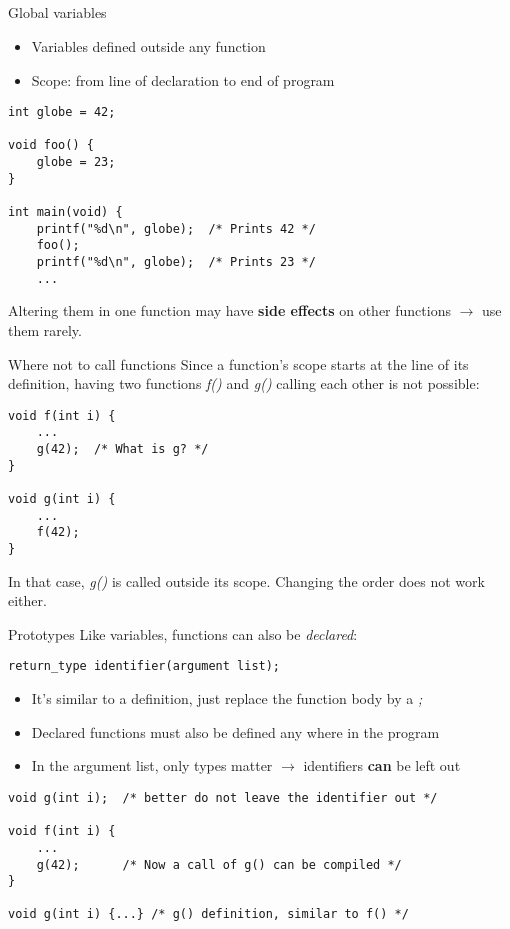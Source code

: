 \subsection{}
\begin{frame}[fragile]{Global variables}
	\begin{itemize}
		\item Variables defined outside any function
		\item Scope: from line of declaration to end of program
	\end{itemize}
	\begin{lstlisting}
int globe = 42;

void foo() {
	globe = 23;
}

int main(void) {
	printf("%d\n", globe);	/* Prints 42 */
	foo();
	printf("%d\n", globe);	/* Prints 23 */
	...
\end{lstlisting}
	Altering them in one function may have \textbf{side effects} on other functions $\rightarrow$ use them rarely.
\end{frame}
\begin{frame}[fragile]{Where not to call functions}
	Since a function's scope starts at the line of its definition, having two functions \textit{f()} and \textit{g()} calling each other is not possible:
	\begin{lstlisting}
void f(int i) {
	...
	g(42);	/* What is g? */
}

void g(int i) {
	...
	f(42);
}
\end{lstlisting}
	In that case, \textit{g()} is called outside its scope. Changing the order does not work either.
\end{frame}
\begin{frame}[fragile]{Prototypes}
	Like variables, functions can also be \textit{declared}:
	\begin{lstlisting}[numbers=none,basicstyle=\itshape\footnotesize]
return_type identifier(argument list);
\end{lstlisting}
	\begin{itemize}
		\item It's similar to a definition, just replace the function body by a \textit{;}
		\item Declared functions must also be defined any where in the program
		\item In the argument list, only types matter $\rightarrow$ identifiers \textbf{can} be left out
	\end{itemize}
	\begin{lstlisting}
void g(int i);	/* better do not leave the identifier out */

void f(int i) {
	...
	g(42);		/* Now a call of g() can be compiled */
}

void g(int i) {...}	/* g() definition, similar to f() */
\end{lstlisting}
\end{frame}
